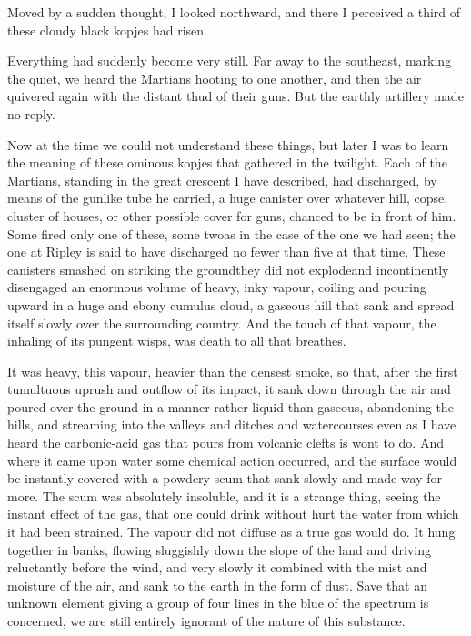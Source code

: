 Moved by a sudden thought, I looked northward, and there I
perceived a third of these cloudy black kopjes had risen.

Everything had suddenly become very still. Far away to the
southeast, marking the quiet, we heard the Martians hooting to one
another, and then the air quivered again with the distant thud of
their guns. But the earthly artillery made no reply.

Now at the time we could not understand these things, but later I
was to learn the meaning of these ominous kopjes that gathered in
the twilight. Each of the Martians, standing in the great crescent
I have described, had discharged, by means of the gunlike tube he
carried, a huge canister over whatever hill, copse, cluster of
houses, or other possible cover for guns, chanced to be in front of
him. Some fired only one of these, some two\dash{}as in the case of the
one we had seen; the one at Ripley is said to have discharged no
fewer than five at that time. These canisters smashed on striking
the ground\dash{}they did not explode\dash{}and incontinently disengaged an
enormous volume of heavy, inky vapour, coiling and pouring upward
in a huge and ebony cumulus cloud, a gaseous hill that sank and
spread itself slowly over the surrounding country. And the touch of
that vapour, the inhaling of its pungent wisps, was death to all
that breathes.

It was heavy, this vapour, heavier than the densest smoke, so that,
after the first tumultuous uprush and outflow of its impact, it
sank down through the air and poured over the ground in a manner
rather liquid than gaseous, abandoning the hills, and streaming
into the valleys and ditches and watercourses even as I have heard
the carbonic-acid gas that pours from volcanic clefts is wont to
do. And where it came upon water some chemical action occurred, and
the surface would be instantly covered with a powdery scum that
sank slowly and made way for more. The scum was absolutely
insoluble, and it is a strange thing, seeing the instant effect of
the gas, that one could drink without hurt the water from which it
had been strained. The vapour did not diffuse as a true gas would
do. It hung together in banks, flowing sluggishly down the slope of
the land and driving reluctantly before the wind, and very slowly
it combined with the mist and moisture of the air, and sank to the
earth in the form of dust. Save that an unknown element giving a
group of four lines in the blue of the spectrum is concerned, we
are still entirely ignorant of the nature of this substance.

